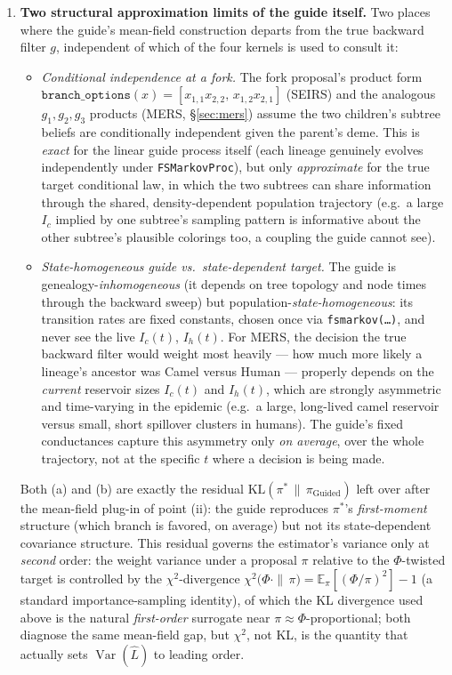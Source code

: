 \documentclass[11pt]{article}
\newcommand{\E}{\mathbb{E}}
\theoremstyle{plain}
\begin{document}
\begin{enumerate}
\item[(vi)] \textbf{Two structural approximation limits of the guide itself.} Two places where the
guide's mean-field construction departs from the true backward filter $g$, independent of which of
the four kernels is used to consult it:
\begin{itemize}
\item[(a)] \emph{Conditional independence at a fork.} The fork proposal's product form
$\texttt{branch\_options}(x)=[x_{1,1}x_{2,2},\,x_{1,2}x_{2,1}]$ (SEIRS) and the analogous
$g_1,g_2,g_3$ products (MERS, \S\ref{sec:mers}) assume the two children's subtree beliefs are
conditionally independent given the parent's deme. This is \emph{exact} for the linear guide
process itself (each lineage genuinely evolves independently under \texttt{FSMarkovProc}), but only
\emph{approximate} for the true target conditional law, in which the two subtrees can share
information through the shared, density-dependent population trajectory (e.g.\ a large $I_c$
implied by one subtree's sampling pattern is informative about the other subtree's plausible
colorings too, a coupling the guide cannot see).
\item[(b)] \emph{State-homogeneous guide vs.\ state-dependent target.} The guide is
genealogy-\emph{inhomogeneous} (it depends on tree topology and node times through the backward
sweep) but population-\emph{state-homogeneous}: its transition rates are fixed constants, chosen
once via \texttt{fsmarkov(\ldots)}, and never see the live $I_c(t)$, $I_h(t)$. For MERS, the
decision the true backward filter would weight most heavily --- how much more likely a lineage's
ancestor was Camel versus Human --- properly depends on the \emph{current} reservoir sizes $I_c(t)$
and $I_h(t)$, which are strongly asymmetric and time-varying in the epidemic (e.g.\ a large,
long-lived camel reservoir versus small, short spillover clusters in humans). The guide's fixed
conductances capture this asymmetry only \emph{on average}, over the whole trajectory, not at the
specific $t$ where a decision is being made.
\end{itemize}
Both (a) and (b) are exactly the residual $\mathrm{KL}(\pi^*\,\|\,\pi_{\mathrm{Guided}})$ left over
after the mean-field plug-in of point (ii): the guide reproduces $\pi^*$'s \emph{first-moment}
structure (which branch is favored, on average) but not its state-dependent covariance structure.
This residual governs the estimator's variance only at \emph{second} order: the weight variance
under a proposal $\pi$ relative to the $\Phi$-twisted target is controlled by the $\chi^2$-divergence
$\chi^2\bigl(\Phi\cdot\|\,\pi\bigr) = \E_\pi[(\Phi/\pi)^2] - 1$ (a standard importance-sampling
identity), of which the KL divergence used above is the natural \emph{first-order} surrogate near
$\pi\approx\Phi$-proportional; both diagnose the same mean-field gap, but $\chi^2$, not KL, is the
quantity that actually sets $\operatorname{Var}(\hat L)$ to leading order.
\end{enumerate}
\end{document}
